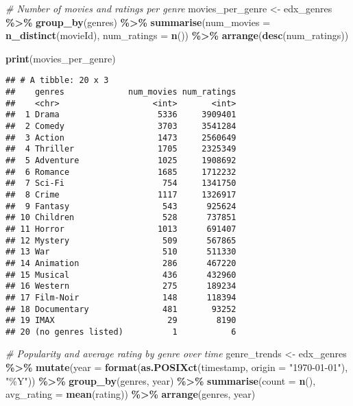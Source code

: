 \documentclass[
]{article}
\newenvironment{Shaded}{\begin{snugshade}}{\end{snugshade}}
\newcommand{\AttributeTok}[1]{\textcolor[rgb]{0.13,0.29,0.53}{#1}}
\newcommand{\CommentTok}[1]{\textcolor[rgb]{0.56,0.35,0.01}{\textit{#1}}}
\newcommand{\FunctionTok}[1]{\textcolor[rgb]{0.13,0.29,0.53}{\textbf{#1}}}
\newcommand{\NormalTok}[1]{#1}
\newcommand{\OtherTok}[1]{\textcolor[rgb]{0.56,0.35,0.01}{#1}}
\newcommand{\SpecialCharTok}[1]{\textcolor[rgb]{0.81,0.36,0.00}{\textbf{#1}}}
\newcommand{\StringTok}[1]{\textcolor[rgb]{0.31,0.60,0.02}{#1}}
\begin{document}
\begin{Shaded}
\begin{Highlighting}[]
\CommentTok{\# Number of movies and ratings per genre}
\NormalTok{movies\_per\_genre }\OtherTok{\textless{}{-}}\NormalTok{ edx\_genres }\SpecialCharTok{\%\textgreater{}\%}
  \FunctionTok{group\_by}\NormalTok{(genres) }\SpecialCharTok{\%\textgreater{}\%}
  \FunctionTok{summarise}\NormalTok{(}\AttributeTok{num\_movies =} \FunctionTok{n\_distinct}\NormalTok{(movieId), }\AttributeTok{num\_ratings =} \FunctionTok{n}\NormalTok{()) }\SpecialCharTok{\%\textgreater{}\%}
  \FunctionTok{arrange}\NormalTok{(}\FunctionTok{desc}\NormalTok{(num\_ratings))}

\FunctionTok{print}\NormalTok{(movies\_per\_genre)}
\end{Highlighting}
\end{Shaded}

\begin{verbatim}
## # A tibble: 20 x 3
##    genres             num_movies num_ratings
##    <chr>                   <int>       <int>
##  1 Drama                    5336     3909401
##  2 Comedy                   3703     3541284
##  3 Action                   1473     2560649
##  4 Thriller                 1705     2325349
##  5 Adventure                1025     1908692
##  6 Romance                  1685     1712232
##  7 Sci-Fi                    754     1341750
##  8 Crime                    1117     1326917
##  9 Fantasy                   543      925624
## 10 Children                  528      737851
## 11 Horror                   1013      691407
## 12 Mystery                   509      567865
## 13 War                       510      511330
## 14 Animation                 286      467220
## 15 Musical                   436      432960
## 16 Western                   275      189234
## 17 Film-Noir                 148      118394
## 18 Documentary               481       93252
## 19 IMAX                       29        8190
## 20 (no genres listed)          1           6
\end{verbatim}

\begin{Shaded}
\begin{Highlighting}[]
\CommentTok{\# Popularity and average rating by genre over time}
\NormalTok{genre\_trends }\OtherTok{\textless{}{-}}\NormalTok{ edx\_genres }\SpecialCharTok{\%\textgreater{}\%}
  \FunctionTok{mutate}\NormalTok{(}\AttributeTok{year =} \FunctionTok{format}\NormalTok{(}\FunctionTok{as.POSIXct}\NormalTok{(timestamp, }\AttributeTok{origin =} \StringTok{"1970{-}01{-}01"}\NormalTok{), }\StringTok{"\%Y"}\NormalTok{)) }\SpecialCharTok{\%\textgreater{}\%}
  \FunctionTok{group\_by}\NormalTok{(genres, year) }\SpecialCharTok{\%\textgreater{}\%}
  \FunctionTok{summarise}\NormalTok{(}\AttributeTok{count =} \FunctionTok{n}\NormalTok{(), }\AttributeTok{avg\_rating =} \FunctionTok{mean}\NormalTok{(rating)) }\SpecialCharTok{\%\textgreater{}\%}
  \FunctionTok{arrange}\NormalTok{(genres, year)}
\end{Highlighting}
\end{Shaded}
\end{document}
